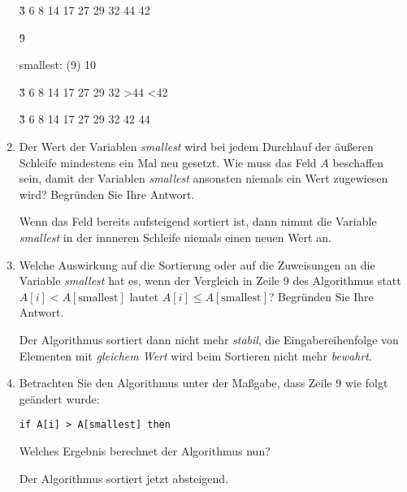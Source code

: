 \documentclass{bschlangaul-aufgabe}
\begin{document}
\begin{enumerate}
\begin{bAntwort}
\v{3 6 8 14 17 27 29 32 44 42}

%

\u{9}

smallest: (9) 10

\v{3 6 8 14 17 27 29 32 >44 <42}

%


\v{3 6 8 14 17 27 29 32 42 44}

\end{bAntwort}

%

\item Der Wert der Variablen \emph{smallest} wird bei jedem Durchlauf
der äußeren Schleife mindestens ein Mal neu gesetzt. Wie muss das Feld
$A$ beschaffen sein, damit der Variablen \emph{smallest} ansonsten
niemals ein Wert zugewiesen wird? Begründen Sie Ihre Antwort.

\begin{bAntwort}
Wenn das Feld bereits aufsteigend sortiert ist, dann nimmt die Variable
\emph{smallest} in der innneren Schleife niemals einen neuen Wert an.
\end{bAntwort}

%

\item Welche Auswirkung auf die Sortierung oder auf die Zuweisungen an
die Variable \emph{smallest} hat es, wenn der Vergleich in Zeile 9 des
Algorithmus statt $A[i] < A[\text{smallest}]$ lautet $A[i] \leq
A[\text{smallest}]$? Begründen Sie Ihre Antwort.

\begin{bAntwort}
Der Algorithmus sortiert dann nicht mehr \emph{stabil}, \dh die
Eingabereihenfolge von Elementen mit \emph{gleichem Wert} wird beim
Sortieren nicht mehr \emph{bewahrt}.
\end{bAntwort}

%

\item Betrachten Sie den Algorithmus unter der Maßgabe, dass Zeile 9 wie
folgt geändert wurde:

\begin{verbatim}
if A[i] > A[smallest] then
\end{verbatim}

Welches Ergebnis berechnet der Algorithmus nun?

\begin{bAntwort}
Der Algorithmus sortiert jetzt absteigend.
\end{bAntwort}


\end{enumerate}
\end{document}
